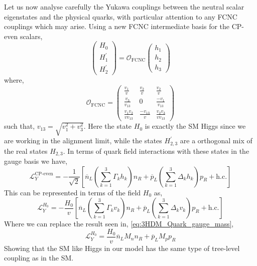 Let us now analyse carefully the Yukawa couplings between the neutral scalar eigenstates and the physical quarks, with particular attention to any FCNC couplings which may arise.
%
Using a new FCNC intermediate basis for the CP-even scalars,
% 
\begin{equation}
\left( 
\begin{array}{c}
H_0 \\
H_1^\prime \\ 
H_2^\prime 
\end{array} 
\right) = \mathcal{O}_{\text{FCNC}} \left( 
\begin{array}{c}
h_1 \\
h_2 \\
h_3 
\end{array} 
\right)
\end{equation} 
where, 
\begin{equation}
\mathcal{O}_{\text{FCNC}} = 
\begin{pmatrix}
\frac{v_1}{v} & \frac{v_2}{v} & \frac{v_2}{v} \\ 
\frac{v_3}{v_{13}} & 0 & \frac{-v_1}{v_{13}}  \\ 
\frac{v_1 v_2}{v v_{13}} & \frac{-v_{13}}{v} &  \frac{v_{2} v_3}{v v_{13}}
\end{pmatrix}  
\end{equation}
%
such that, $v_{13} = \sqrt{v_1^2 + v_3^2 }$. Here the state $H_0$ is exactly the SM Higgs since we are working in the alignment limit, while the states $H^\prime_{2,3}$ are a orthogonal mix of the real states $H_{2,3}$. 
%
In terms of quark field interactions with these states in the gauge basis we have, 
\begin{equation}
\mathcal{L}_Y^{\text{CP-even}} = 
- \frac{1}{\sqrt{2}} \left[ \overline{n}_L \left( \sum_{k=1}^3 \Gamma_k h_k \right) n_R + \overline{p}_L \left( \sum_{k=1}^3 \Delta_k h_k \right) p_R  + \text{h.c.}  \right] 
\end{equation}
This can be represented in terms of the field $H_0$ as, 
\begin{equation}
\mathcal{L}_Y^{H_0} =
- \frac{H_0}{v} \left[ \overline{n}_L \left( \sum_{k=1}^3 \Gamma_k v_k \right) n_R + \overline{p}_L \left( \sum_{k=1}^3 \Delta_k v_k \right) p_R + \text{h.c.} \right] 
\end{equation}
Where we can replace the result seen in, \ref{eq:3HDM_Quark_gauge_mass}, 
%
\begin{equation}
\mathcal{L}_Y^{H_0} = \frac{H_0}{v} \overline{n}_L M_n n_R +  \overline{p}_L M_p p_R  
\end{equation} 
Showing that the SM like Higgs in our model has the same type of tree-level coupling as in the SM. 

